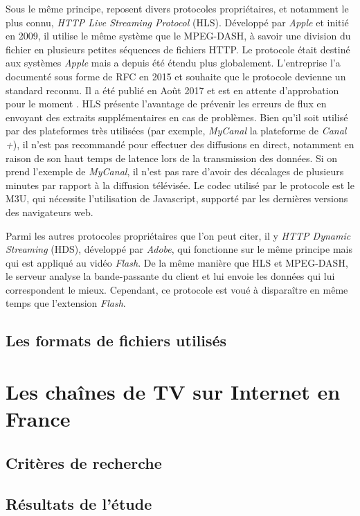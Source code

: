 \documentclass{polytech/polytech}
\begin{document}
Sous le même principe, reposent divers protocoles propriétaires, et notamment le plus connu, \textit{HTTP Live Streaming Protocol} (HLS). Développé par \textit{Apple} et initié en 2009, il utilise le même système que le MPEG-DASH, à savoir une division du fichier en plusieurs petites séquences de fichiers HTTP. Le protocole était destiné aux systèmes \textit{Apple} mais a depuis été étendu plus globalement. L’entreprise l’a documenté sous forme de RFC en 2015 et souhaite que le protocole devienne un standard reconnu. Il a été publié en Août 2017 et est en attente d’approbation pour le moment \cite{pantos_http_2017}. HLS présente l’avantage de prévenir les erreurs de flux en envoyant des extraits supplémentaires en cas de problèmes. Bien qu’il soit utilisé par des plateformes très utilisées (par exemple, \textit{MyCanal} la plateforme de \textit{Canal +}), il n’est pas recommandé pour effectuer des diffusions en direct, notamment en raison de son haut temps de latence lors de la transmission des données. Si on prend l’exemple de \textit{MyCanal}, il n’est pas rare d’avoir des décalages de plusieurs minutes par rapport à la diffusion télévisée. Le codec utilisé par le protocole est le M3U, qui nécessite l’utilisation de Javascript, supporté par les dernières versions des navigateurs web.

Parmi les autres protocoles propriétaires que l’on peut citer, il y \textit{HTTP Dynamic Streaming} (HDS), développé par \textit{Adobe}, qui fonctionne sur le même principe mais qui est appliqué au vidéo \textit{Flash}. De la même manière que HLS et MPEG-DASH, le serveur analyse la bande-passante du client et lui envoie les données qui lui correspondent le mieux. Cependant, ce protocole est voué à disparaître en même temps que l’extension \textit{Flash}.


\section{Les formats de fichiers utilisés}


\chapter{Les chaînes de TV sur Internet en France}


\section{Critères de recherche}


\section{Résultats de l'étude}
\end{document}
